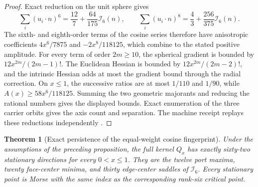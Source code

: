 \documentclass[11pt]{article}
\newtheorem{theorem}{Theorem}[section]
\theoremstyle{remark}
\theoremstyle{plain}
\begin{document}
\begin{proof}
Exact reduction on the unit sphere gives
\[
 \sum_i(u_i\cdot n)^6=\frac{12}{7}+\frac{64}{175}\mathcal I_6(n),
 \qquad
 \sum_i(u_i\cdot n)^8=\frac43+\frac{256}{375}\mathcal I_6(n).
\]
The sixth- and eighth-order terms of the cosine series therefore have
anisotropic coefficients \(4x^6/7875\) and \(-2x^8/118125\), which combine
to the stated positive amplitude. For every term of order \(2m\ge10\), the
spherical gradient is bounded by \(12x^{2m}/(2m-1)!\). The Euclidean Hessian
is bounded by \(12x^{2m}/(2m-2)!\), and the intrinsic Hessian adds at most the
gradient bound through the radial correction. On \(x\le1\), the successive
ratios are at most \(1/110\) and \(1/90\), while
\(A(x)\ge58x^6/118125\). Summing the two geometric majorants and reducing the
rational numbers gives the displayed bounds. Exact enumeration of the three
carrier orbits gives the axis count and separation. The machine receipt
replays these reductions independently \cite{ophrepo}.
\end{proof}

\begin{theorem}[Exact persistence of the equal-weight cosine fingerprint]
\label{thm:full-cosine-persistence}
Under the assumptions of the preceding proposition, the full kernel
\(Q_x\) has exactly sixty-two stationary directions for every
\(0<x\le1\). They are the twelve port maxima, twenty face-center minima,
and thirty edge-center saddles of \(\mathcal I_6\). Every stationary point is
Morse with the same index as the corresponding rank-six critical point.
\end{theorem}
\end{document}
